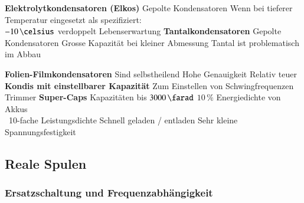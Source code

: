 \begin{minipage}[t]{0.48\columnwidth}
    \begin{outline}
        \1 \textbf{Elektrolytkondensatoren (Elkos)}
            \2 Gepolte Kondensatoren
            \2 Wenn bei tieferer Temperatur eingesetzt als spezifiziert: \\
                $-10 \, \celsius$ verdoppelt Lebenserwartung
        \1 \textbf{Tantalkondensatoren}
            \2 Gepolte Kondensatoren
            \2 Grosse Kapazität bei kleiner Abmessung
            \2 Tantal ist problematisch im Abbau
    \end{outline}
\end{minipage}
\hfill
\begin{minipage}[t]{0.48\columnwidth}
    \begin{outline}
        \1 \textbf{Folien-Filmkondensatoren}
            \2 Sind selbstheilend 
            \2 Hohe Genauigkeit
            \2 Relativ teuer
        \1 \textbf{Kondis mit einstellbarer Kapazität}
            \2 Zum Einstellen von Schwingfrequenzen
            \2 Trimmer
        \1 \textbf{Super-Caps}
            \2 Kapazitäten bis $3000 \, \farad$
            \2 $10 \, \%$ Energiedichte von Akkus \\
                \textrightarrow\ 10-fache Leistungsdichte 
            \2 Schnell geladen / entladen
            \2 Sehr kleine Spannungsfestigkeit
    \end{outline}
\end{minipage}


\subsection{Reale Spulen}


\subsubsection{Ersatzschaltung und Frequenzabhängigkeit}

